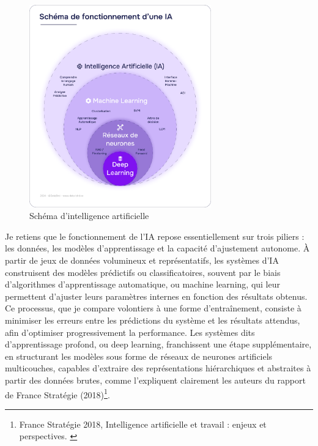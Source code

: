 \documentclass[11pt,a4paper]{report}
\begin{document}
\begin{figure}[h]
    \centering
    \includegraphics[width=0.7\textwidth]{images/2.1.1_2.png}
    \caption{Schéma d’intelligence artificielle}
    \label{fig:2.1.1_2}
\end{figure}

Je retiens que le fonctionnement de l’IA repose essentiellement sur trois piliers : les données, les modèles d’apprentissage et la capacité d’ajustement autonome. À partir de jeux de données volumineux et représentatifs, les systèmes d’IA construisent des modèles prédictifs ou classificatoires, souvent par le biais d’algorithmes d’apprentissage automatique, ou machine learning, qui leur permettent d’ajuster leurs paramètres internes en fonction des résultats obtenus. Ce processus, que je compare volontiers à une forme d’entraînement, consiste à minimiser les erreurs entre les prédictions du système et les résultats attendus, afin d’optimiser progressivement la performance. Les systèmes dits d’apprentissage profond, ou deep learning, franchissent une étape supplémentaire, en structurant les modèles sous forme de réseaux de neurones artificiels multicouches, capables d’extraire des représentations hiérarchiques et abstraites à partir des données brutes, comme l’expliquent clairement les auteurs du rapport de France Stratégie (2018)\footnote{France Stratégie 2018, Intelligence artificielle et travail : enjeux et perspectives. \cite{francestrategie}}.
\end{document}
